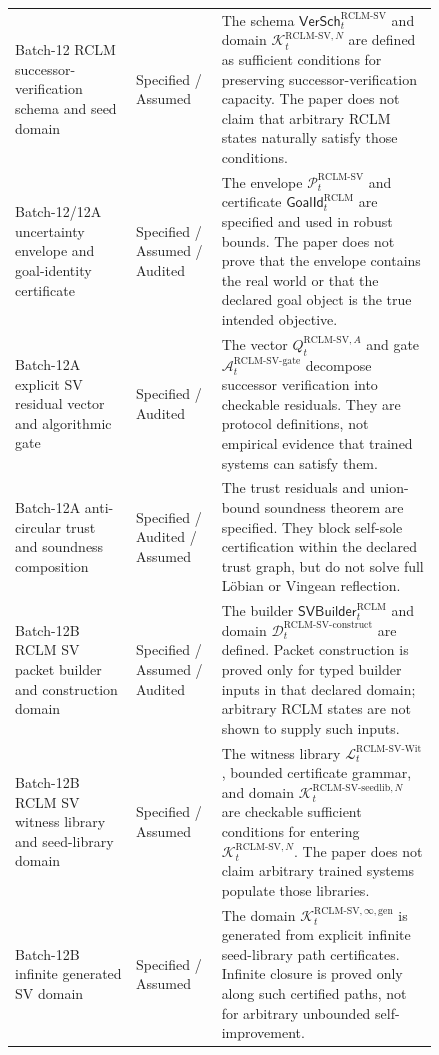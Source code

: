\documentclass[11pt,a4paper]{article}
\newcommand{\Lcal}{\mathcal L}
\newcommand{\Pcal}{\mathcal P}
\newcommand{\Acal}{\mathcal A}
\newcommand{\Kcal}{\mathcal K}
\newcommand{\Dcal}{\mathcal D}
\newcommand{\RCLM}{\mathrm{RCLM}}
\newcommand{\gate}{\mathrm{gate}}
\begin{document}
\begin{longtable}{p{0.24\linewidth}p{0.17\linewidth}p{0.43\linewidth}}
Batch-12 RCLM successor-verification schema and seed domain & Specified / Assumed & The schema \(\mathsf{VerSch}_t^{\RCLM\text{-}\mathrm{SV}}\) and domain \(\Kcal_t^{\RCLM\text{-}\mathrm{SV},N}\) are defined as sufficient conditions for preserving successor-verification capacity. The paper does not claim that arbitrary RCLM states naturally satisfy those conditions.\\
Batch-12/12A uncertainty envelope and goal-identity certificate & Specified / Assumed / Audited & The envelope \(\Pcal_t^{\RCLM\text{-}\mathrm{SV}}\) and certificate \(\mathsf{GoalId}_t^{\RCLM}\) are specified and used in robust bounds. The paper does not prove that the envelope contains the real world or that the declared goal object is the true intended objective.\\
Batch-12A explicit SV residual vector and algorithmic gate & Specified / Audited & The vector \(Q_t^{\RCLM\text{-}\mathrm{SV},A}\) and gate \(\Acal_t^{\RCLM\text{-}\mathrm{SV}\text{-}\gate}\) decompose successor verification into checkable residuals. They are protocol definitions, not empirical evidence that trained systems can satisfy them.\\
Batch-12A anti-circular trust and soundness composition & Specified / Audited / Assumed & The trust residuals and union-bound soundness theorem are specified. They block self-sole certification within the declared trust graph, but do not solve full L\"obian or Vingean reflection.\\
Batch-12B RCLM SV packet builder and construction domain & Specified / Assumed / Audited & The builder \(\mathsf{SVBuilder}_t^{\RCLM}\) and domain \(\Dcal_t^{\RCLM\text{-}\mathrm{SV\mbox{-}construct}}\) are defined. Packet construction is proved only for typed builder inputs in that declared domain; arbitrary RCLM states are not shown to supply such inputs.\\
Batch-12B RCLM SV witness library and seed-library domain & Specified / Assumed & The witness library \(\Lcal_t^{\RCLM\text{-}\mathrm{SV\mbox{-}Wit}}\), bounded certificate grammar, and domain \(\Kcal_t^{\RCLM\text{-}\mathrm{SV\mbox{-}seedlib},N}\) are checkable sufficient conditions for entering \(\Kcal_t^{\RCLM\text{-}\mathrm{SV},N}\). The paper does not claim arbitrary trained systems populate those libraries.\\
Batch-12B infinite generated SV domain & Specified / Assumed & The domain \(\Kcal_t^{\RCLM\text{-}\mathrm{SV},\infty,\mathrm{gen}}\) is generated from explicit infinite seed-library path certificates. Infinite closure is proved only along such certified paths, not for arbitrary unbounded self-improvement.\\

\end{longtable}
\end{document}
